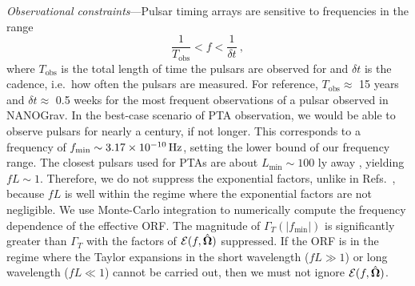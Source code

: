 \documentclass[prd,twocolumn,aps,psfig,nofootinbib,nobibnotes,superscriptaddress,preprintnumbers,times]{revtex4-2}
\newcommand{\Hz}{\,{\rm Hz}}
\begin{document}
\textit{Observational constraints}---Pulsar timing arrays are sensitive to frequencies in the range \cite{Moore:2014lga}
\begin{equation}\label{eq:freqrange}
    \frac{1}{T_{\text{obs}}} < f < \frac{1}{\delta t}\ ,
\end{equation} 
where $T_{\text{obs}}$ is the total length of time the pulsars are observed for and $\delta t$ is the cadence, i.e.\ how often the pulsars are measured. For reference, $T_{\text{obs}} \approx$ 15 years and $\delta t \approx$ 0.5 weeks for the most frequent observations of a pulsar observed in NANOGrav. 
In the best-case scenario of PTA observation, we would be able to observe pulsars for nearly a century, if not longer. This corresponds to a frequency of $f_{\text{min}} \sim 3.17 \times 10^{-10} \Hz$, setting the lower bound of our frequency range. The closest pulsars used for PTAs are about $L_{\text{min}} \sim 100$ ly away \cite{Anholm:2008wy}, yielding $fL \sim 1$. Therefore, we do not suppress the exponential factors, unlike in Refs.\ \cite{Liang:2021bct,Arjona:2024cex}, because $fL$ is well within the regime where the exponential factors are not negligible. %
We use Monte-Carlo integration to numerically compute the frequency dependence of the effective ORF. The magnitude of $\Gamma_T(|f_{\text{min}}|)$ is significantly greater than $\Gamma_T$ with the factors of $\mathcal{E}(f, \hat{\bf \Omega})$ suppressed. If the ORF is in the regime where the Taylor expansions in the short wavelength ($fL \gg 1$) or long wavelength ($fL \ll 1$) cannot be carried out, then we must not ignore $\mathcal{E}(f, \hat{\bf \Omega})$.
\end{document}
